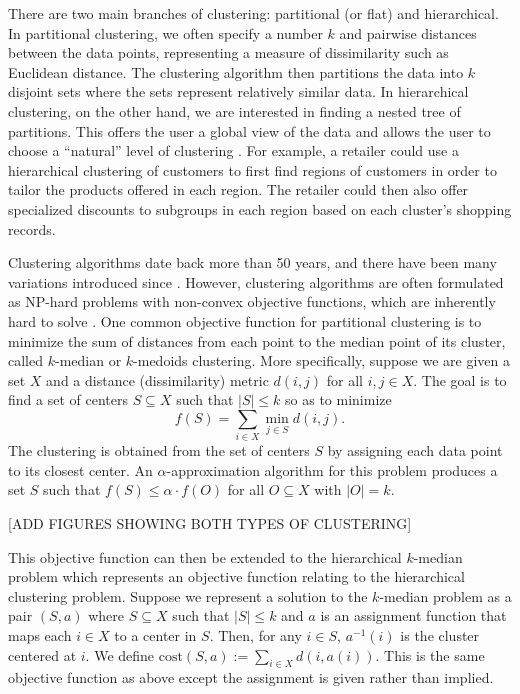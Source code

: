 \documentclass[conference, 10pt, final]{IEEEtran}
\begin{document}
There are two main branches of clustering: partitional (or flat) and hierarchical. In partitional clustering, we often specify a number $k$ and pairwise distances between the data points, representing a measure of dissimilarity such as Euclidean distance. The clustering algorithm then partitions the data into $k$ disjoint sets where the sets represent relatively similar data. In hierarchical clustering, on the other hand, we are interested in finding a nested tree of partitions. This offers the user a global view of the data and allows the user to choose a ``natural'' level of clustering \cite{ESL}. For example, a retailer could use a hierarchical clustering of customers to first find regions of customers in order to tailor the products offered in each region. The retailer could then also offer specialized discounts to subgroups in each region based on each cluster's shopping records. 

Clustering algorithms date back more than 50 years, and there have been many variations introduced since \cite{Jain}. However, clustering algorithms are often formulated as NP-hard problems with non-convex objective functions, which are inherently hard to solve \cite{Jain}.
One common objective function for partitional clustering is to minimize the sum of distances from each point to the median point of its cluster, called $k$-median or $k$-medoids clustering. More specifically, suppose we are given a set $X$ and a distance (dissimilarity) metric $d(i,j)$ for all $i,j \in X$. The goal is to find a set of centers $S \subseteq X$ such that $|S| \leq k$ so as to minimize 
\[ f(S) = \sum_{ i\in X} \min_{j \in S} d(i,j). \]
The clustering is obtained from the set of centers $S$ by assigning each data point to its closest center.  An $\alpha$-approximation algorithm for this problem produces a set $S$ such that $f(S) \leq \alpha \cdot f(O)$ for all $O \subseteq X$ with $|O| = k$. 

[ADD FIGURES SHOWING BOTH TYPES OF CLUSTERING]

This objective function can then be extended to the hierarchical $k$-median problem which represents an objective function relating to the hierarchical clustering problem. Suppose we represent a solution to the $k$-median problem as a pair $(S, a)$ where $S \subseteq X$ such that $|S| \leq k$ and $a$ is an assignment function that maps each $i \in X$ to a center in $S$. Then, for any $i \in S$, $a^{-1}(i)$ is the cluster centered at $i$. We define $\mathrm{cost}(S,a) := \sum_{i \in X} d(i, a(i))$. This is the same objective function as above except the assignment is given rather than implied.
\end{document}
